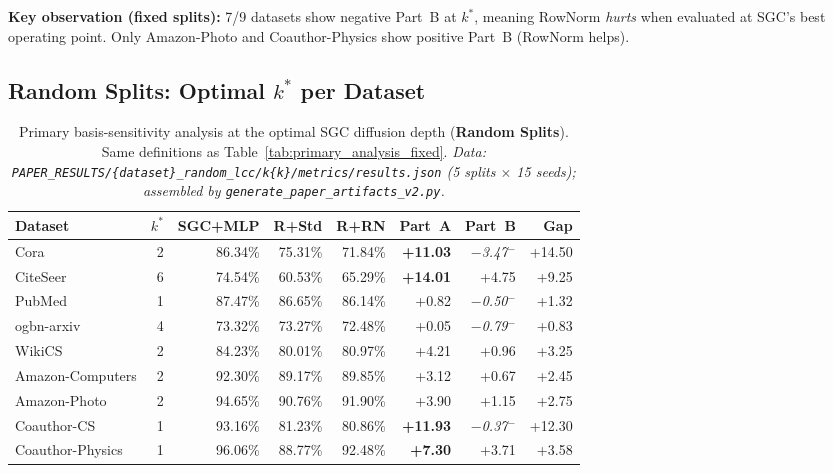 \documentclass[11pt]{article}
\begin{document}
\noindent\textbf{Key observation (fixed splits):} 7/9 datasets show negative Part~B at
$k^*$, meaning RowNorm \emph{hurts} when evaluated at SGC's best operating point.
Only Amazon-Photo and Coauthor-Physics show positive Part~B (RowNorm helps).

\subsection{Random Splits: Optimal $k^*$ per Dataset}

\begin{table}[H]
\centering\small\setlength{\tabcolsep}{5pt}
\caption{Primary basis-sensitivity analysis at the optimal SGC diffusion depth
(\textbf{Random Splits}).  Same definitions as Table~\ref{tab:primary_analysis_fixed}.
\textit{\scriptsize Data: \texttt{PAPER\_RESULTS/\{dataset\}\_random\_lcc/k\{k\}/metrics/results.json}
(5 splits $\times$ 15 seeds); assembled by \texttt{generate\_paper\_artifacts\_v2.py}.}}
\label{tab:primary_analysis_random}
\begin{tabular}{lrrrrrrr}
\toprule
Dataset & $k^*$ & SGC+MLP & R+Std & R+RN & Part~A & Part~B & Gap \\
\midrule
Cora                 &   2 & 86.34\% & 75.31\% & 71.84\% & \textbf{+11.03} & \textit{$-$3.47}$^-$ & +14.50 \\
CiteSeer             &   6 & 74.54\% & 60.53\% & 65.29\% & \textbf{+14.01} & +4.75 & +9.25 \\
PubMed               &   1 & 87.47\% & 86.65\% & 86.14\% & +0.82 & \textit{$-$0.50}$^-$ & +1.32 \\
ogbn-arxiv           &   4 & 73.32\% & 73.27\% & 72.48\% & +0.05 & \textit{$-$0.79}$^-$ & +0.83 \\
WikiCS               &   2 & 84.23\% & 80.01\% & 80.97\% & +4.21 & +0.96 & +3.25 \\
Amazon-Computers     &   2 & 92.30\% & 89.17\% & 89.85\% & +3.12 & +0.67 & +2.45 \\
Amazon-Photo         &   2 & 94.65\% & 90.76\% & 91.90\% & +3.90 & +1.15 & +2.75 \\
Coauthor-CS          &   1 & 93.16\% & 81.23\% & 80.86\% & \textbf{+11.93} & \textit{$-$0.37}$^-$ & +12.30 \\
Coauthor-Physics     &   1 & 96.06\% & 88.77\% & 92.48\% & \textbf{+7.30} & +3.71 & +3.58 \\
\bottomrule
\end{tabular}
\end{table}
\end{document}
